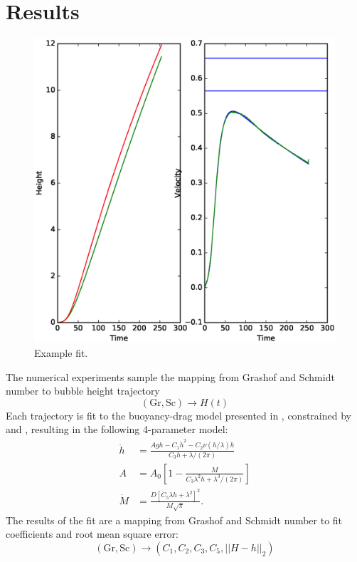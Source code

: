 \section{Results}

\newcommand{\fittol}[0]{0.01~}

\begin{figure}
\includegraphics[width=\columnwidth]{figs/H-0.0016-0.0002.eps}
\caption{ 
  Example fit.
}
\end{figure}

The numerical experiments sample the mapping from Grashof and Schmidt number to bubble height trajectory
\begin{equation*}
\left(\text{Gr}, \text{Sc}\right) \rightarrow H(t)
\end{equation*}
Each trajectory is fit to the buoyancy-drag model presented in , constrained by  and , resulting in the following 4-parameter model:
\begin{align}
\ddot{h} &= \frac{A g h - C_1 \dot{h}^2 - C_2 \nu (h/\lambda) \dot{h}}{ C_3 h + \lambda/(2\pi) } \\
A &= A_0 \left[ 1 - \frac{M}{C_3 \lambda^2 h  + \lambda^3 / (2\pi)} \right]  \\
\dot{M} &= \frac{D \left[C_5 \lambda h + \lambda^2\right] ^2}{M \sqrt{\pi}} .
\end{align}
The results of the fit are a mapping from Grashof and Schmidt number to fit coefficients and root mean square error:
\begin{equation}
\left(\text{Gr}, \text{Sc}\right) \rightarrow \left(C_1, C_2, C_3, C_5, || H - h ||_2\right) 
\end{equation}

